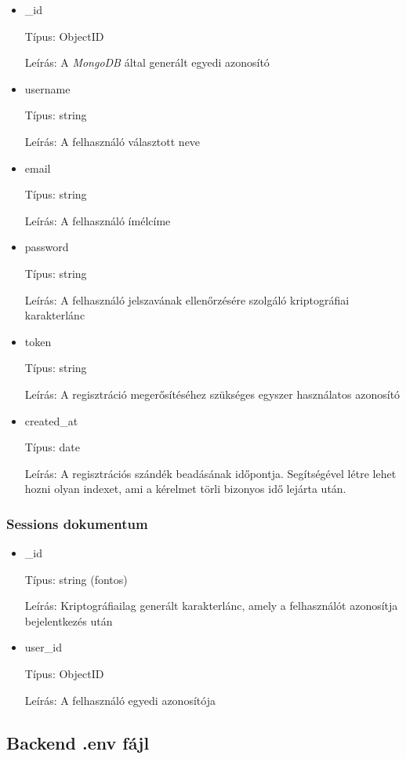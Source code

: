 \begin{itemize}
  \item \_id

        Típus: ObjectID

        Leírás: A \emph{MongoDB} által generált egyedi azonosító
  \item username

        Típus: string

        Leírás: A felhasználó választott neve
  \item email

        Típus: string

        Leírás: A felhasználó ímélcíme
  \item password

        Típus: string

        Leírás: A felhasználó jelszavának ellenőrzésére szolgáló kriptográfiai karakterlánc
  \item token

        Típus: string

        Leírás: A regisztráció megerősítéséhez szükséges egyszer használatos azonosító
  \item created\_at

        Típus: date

        Leírás: A regisztrációs szándék beadásának időpontja. Segítségével létre lehet hozni olyan indexet, ami a kérelmet törli bizonyos idő lejárta után.
\end{itemize}
\subsubsection{Sessions dokumentum}

\begin{itemize}
  \item \_id

        Típus: string (fontos)

        Leírás: Kriptográfiailag generált karakterlánc, amely a felhasználót azonosítja bejelentkezés után
  \item user\_id

        Típus: ObjectID

        Leírás: A felhasználó egyedi azonosítója
\end{itemize}


\subsection{Backend .env fájl}

